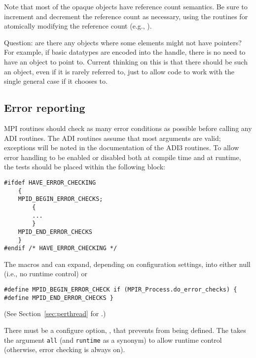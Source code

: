 \documentclass{article}
\begin{document}
Note that most of the opaque objects have reference count semantics.
Be sure to increment and decrement the reference count as necessary,
using the routines for atomically modifying the reference count (e.g.,
). 

Question: are there any objects where some elements might not have
pointers?  For example, if basic datatypes are encoded into the
handle, there is no need to have an object to point to.  Current
thinking on this is that there should be such an object, even if it is
rarely referred to, just to allow code to work with the single general
case if it chooses to.

\subsection{Error reporting}
\label{sec:error-reporting}

MPI routines should check as many error conditions as possible before
calling any ADI routines.  The ADI routines assume that most arguments are
valid; exceptions will be noted in the documentation of the ADI3 routines.
To allow error handling to be enabled or disabled both at compile
time 
and at runtime, the tests should be placed within the following block:
\begin{verbatim}
#ifdef HAVE_ERROR_CHECKING
    {
    MPID_BEGIN_ERROR_CHECKS;
        {
        ...
        }
    MPID_END_ERROR_CHECKS
    }
#endif /* HAVE_ERROR_CHECKING */
\end{verbatim}
The macros  and  can
expand, depending on configuration settings, into either null (i.e.,
no runtime control) or 
\begin{verbatim}
#define MPID_BEGIN_ERROR_CHECK if (MPIR_Process.do_error_checks) {
#define MPID_END_ERROR_CHECKS }
\end{verbatim}
(See Section~\ref{sec:perthread} for .)

There must be a configure option,
,  
that prevents  from being defined.  The
takes the argument \texttt{all} (and \texttt{runtime} as a synonym) to allow
runtime control (otherwise, error checking is always on).
\end{document}
